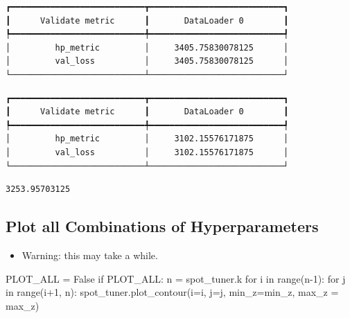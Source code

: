 \documentclass[
  letterpaper,
  DIV=11,
  numbers=noendperiod]{scrreprt}
\newenvironment{Shaded}{\begin{snugshade}}{\end{snugshade}}
\newcommand{\BuiltInTok}[1]{\textcolor[rgb]{0.00,0.23,0.31}{#1}}
\newcommand{\ControlFlowTok}[1]{\textcolor[rgb]{0.00,0.23,0.31}{#1}}
\newcommand{\DecValTok}[1]{\textcolor[rgb]{0.68,0.00,0.00}{#1}}
\newcommand{\KeywordTok}[1]{\textcolor[rgb]{0.00,0.23,0.31}{#1}}
\newcommand{\NormalTok}[1]{\textcolor[rgb]{0.00,0.23,0.31}{#1}}
\newcommand{\OperatorTok}[1]{\textcolor[rgb]{0.37,0.37,0.37}{#1}}
\newcommand{\VariableTok}[1]{\textcolor[rgb]{0.07,0.07,0.07}{#1}}
\providecommand{\tightlist}{%
  \setlength{\itemsep}{0pt}\setlength{\parskip}{0pt}}\usepackage{longtable,booktabs,array}
\begin{document}
\begin{verbatim}
┏━━━━━━━━━━━━━━━━━━━━━━━━━━━┳━━━━━━━━━━━━━━━━━━━━━━━━━━━┓
┃      Validate metric      ┃       DataLoader 0        ┃
┡━━━━━━━━━━━━━━━━━━━━━━━━━━━╇━━━━━━━━━━━━━━━━━━━━━━━━━━━┩
│         hp_metric         │     3405.75830078125      │
│         val_loss          │     3405.75830078125      │
└───────────────────────────┴───────────────────────────┘
\end{verbatim}

\begin{verbatim}
┏━━━━━━━━━━━━━━━━━━━━━━━━━━━┳━━━━━━━━━━━━━━━━━━━━━━━━━━━┓
┃      Validate metric      ┃       DataLoader 0        ┃
┡━━━━━━━━━━━━━━━━━━━━━━━━━━━╇━━━━━━━━━━━━━━━━━━━━━━━━━━━┩
│         hp_metric         │     3102.15576171875      │
│         val_loss          │     3102.15576171875      │
└───────────────────────────┴───────────────────────────┘
\end{verbatim}

\begin{verbatim}
3253.95703125
\end{verbatim}

\subsection{Plot all Combinations of
Hyperparameters}\label{plot-all-combinations-of-hyperparameters-2}

\begin{itemize}
\tightlist
\item
  Warning: this may take a while.
\end{itemize}

\begin{Shaded}
\begin{Highlighting}[]
\NormalTok{PLOT\_ALL }\OperatorTok{=} \VariableTok{False}
\ControlFlowTok{if}\NormalTok{ PLOT\_ALL:}
\NormalTok{    n }\OperatorTok{=}\NormalTok{ spot\_tuner.k}
    \ControlFlowTok{for}\NormalTok{ i }\KeywordTok{in} \BuiltInTok{range}\NormalTok{(n}\OperatorTok{{-}}\DecValTok{1}\NormalTok{):}
        \ControlFlowTok{for}\NormalTok{ j }\KeywordTok{in} \BuiltInTok{range}\NormalTok{(i}\OperatorTok{+}\DecValTok{1}\NormalTok{, n):}
\NormalTok{            spot\_tuner.plot\_contour(i}\OperatorTok{=}\NormalTok{i, j}\OperatorTok{=}\NormalTok{j, min\_z}\OperatorTok{=}\NormalTok{min\_z, max\_z }\OperatorTok{=}\NormalTok{ max\_z)}
\end{Highlighting}
\end{Shaded}
\end{document}
